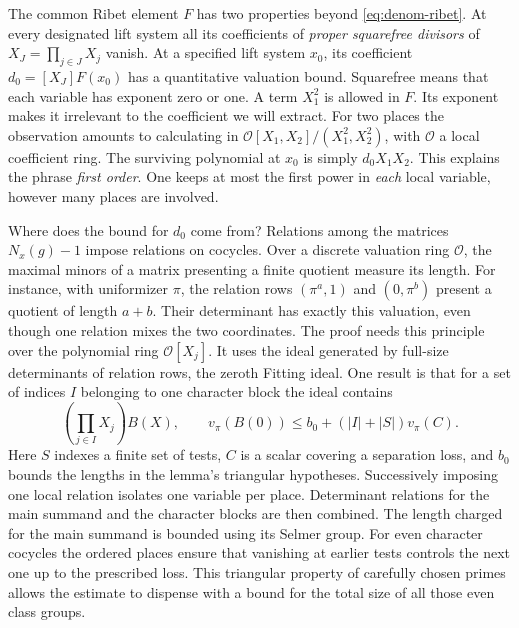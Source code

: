 \documentclass[11pt,letterpaper]{article}
\begin{document}
The common Ribet element $F$ has two properties beyond \eqref{eq:denom-ribet}. At every designated lift system all its coefficients of \emph{proper squarefree divisors} of $X_J=\prod_{j\in J}X_j$ vanish. At a specified lift system $x_0$, its coefficient $d_0=[X_J]F(x_0)$ has a quantitative valuation bound. Squarefree means that each variable has exponent zero or one. A term $X_1^2$ is allowed in $F$. Its exponent makes it irrelevant to the coefficient we will extract. For two places the observation amounts to calculating in $\mathcal O[X_1,X_2]/(X_1^2,X_2^2)$, with $\mathcal O$ a local coefficient ring. The surviving polynomial at $x_0$ is simply $d_0X_1X_2$. This explains the phrase \emph{first order}. One keeps at most the first power in \emph{each} local variable, however many places are involved.

Where does the bound for $d_0$ come from? Relations among the matrices $N_x(g)-1$ impose relations on cocycles. Over a discrete valuation ring $\mathcal O$, the maximal minors of a matrix presenting a finite quotient measure its length. For instance, with uniformizer $\pi$, the relation rows $(\pi^a,1)$ and $(0,\pi^b)$ present a quotient of length $a+b$. Their determinant has exactly this valuation, even though one relation mixes the two coordinates. The proof needs this principle over the polynomial ring $\mathcal O[X_j]$. It uses the ideal generated by full-size determinants of relation rows, the zeroth Fitting ideal. One result is that for a set of indices $I$ belonging to one character block the ideal contains
\[
             \left(\prod_{j\in I}X_j\right)B(X),\qquad
             v_\pi(B(0))\le b_0+(|I|+|S|)v_\pi(C).
\]
Here $S$ indexes a finite set of tests, $C$ is a scalar covering a separation loss, and $b_0$ bounds the lengths in the lemma's triangular hypotheses. Successively imposing one local relation isolates one variable per place. Determinant relations for the main summand and the character blocks are then combined. The length charged for the main summand is bounded using its Selmer group. For even character cocycles the ordered places ensure that vanishing at earlier tests controls the next one up to the prescribed loss. This triangular property of carefully chosen primes allows the estimate to dispense with a bound for the total size of all those even class groups.
\end{document}
